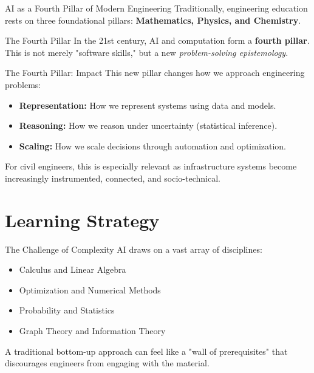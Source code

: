 \documentclass[german,10pt]{beamer}
\begin{document}
\begin{frame}{AI as a Fourth Pillar of Modern Engineering}
    \justifying
    Traditionally, engineering education rests on three foundational pillars: \textbf{Mathematics, Physics, and Chemistry}.
    
    \vspace{1em}
    \begin{conceptbox}{The Fourth Pillar}
    In the 21st century, AI and computation form a \textbf{fourth pillar}. This is not merely "software skills," but a new \emph{problem-solving epistemology}.
    \end{conceptbox}
\end{frame}

\begin{frame}{The Fourth Pillar: Impact}
    \justifying
    This new pillar changes how we approach engineering problems:
    \begin{itemize}
        \item \textbf{Representation:} How we represent systems using data and models.
        \item \textbf{Reasoning:} How we reason under uncertainty (statistical inference).
        \item \textbf{Scaling:} How we scale decisions through automation and optimization.
    \end{itemize}
    \vspace{1em}
    For civil engineers, this is especially relevant as infrastructure systems become increasingly instrumented, connected, and socio-technical.
\end{frame}

\section{Learning Strategy}

\begin{frame}{The Challenge of Complexity}
    \justifying
    AI draws on a vast array of disciplines:
    \begin{itemize}
        \item Calculus and Linear Algebra
        \item Optimization and Numerical Methods
        \item Probability and Statistics
        \item Graph Theory and Information Theory
    \end{itemize}
    \vspace{1em}
    A traditional bottom-up approach can feel like a "wall of prerequisites" that discourages engineers from engaging with the material.
\end{frame}
\end{document}
